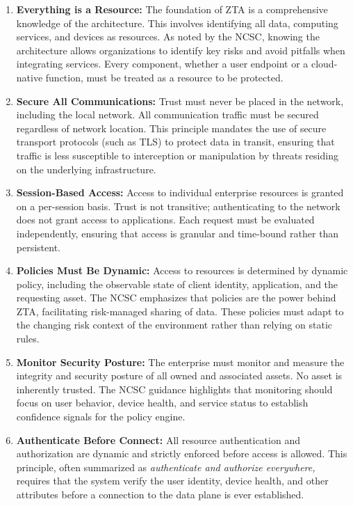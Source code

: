 \documentclass[12pt, a4paper, reqno, oneside]{book}
\begin{document}
\begin{enumerate}
    \item \textbf{Everything is a Resource:} 
    The foundation of ZTA is a comprehensive knowledge of the architecture. This involves identifying all data, computing services, and devices as resources. As noted by the NCSC, knowing the architecture allows organizations to identify key risks and avoid pitfalls when integrating services. Every component, whether a user endpoint or a cloud-native function, must be treated as a resource to be protected.
    
    \item \textbf{Secure All Communications:} 
    Trust must never be placed in the network, including the local network. All communication traffic must be secured regardless of network location. This principle mandates the use of secure transport protocols (such as TLS) to protect data in transit, ensuring that traffic is less susceptible to interception or manipulation by threats residing on the underlying infrastructure.
    
    \item \textbf{Session-Based Access:} 
    Access to individual enterprise resources is granted on a per-session basis. Trust is not transitive; authenticating to the network does not grant access to applications. Each request must be evaluated independently, ensuring that access is granular and time-bound rather than persistent.
    
    \item \textbf{Policies Must Be Dynamic:} 
    Access to resources is determined by dynamic policy, including the observable state of client identity, application, and the requesting asset. The NCSC emphasizes that policies are the power behind ZTA, facilitating risk-managed sharing of data. These policies must adapt to the changing risk context of the environment rather than relying on static rules.
    
    \item \textbf{Monitor Security Posture:} 
    The enterprise must monitor and measure the integrity and security posture of all owned and associated assets. No asset is inherently trusted. The NCSC guidance highlights that monitoring should focus on user behavior, device health, and service status to establish confidence signals for the policy engine.
    
    \item \textbf{Authenticate Before Connect:} 
    All resource authentication and authorization are dynamic and strictly enforced before access is allowed. This principle, often summarized as \textit{authenticate and authorize everywhere,} requires that the system verify the user identity, device health, and other attributes before a connection to the data plane is ever established.
    

\end{enumerate}
\end{document}

